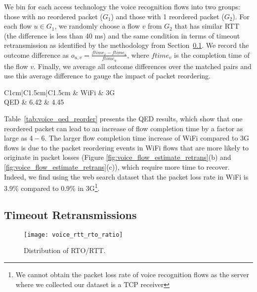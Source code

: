 We bin for each access technology the voice recognition flows into two groups: those with no reordered packet ($G_1$) and those with 1 reordered packet ($G_2$). For each flow $u \in G_1$, we randomly choose a flow $v$ from $G_2$ that has similar RTT (\ie the difference is less than 40 ms) and the same condition in terms of timeout retransmission as identified by the methodology from Section~\ref{sec:v_rto}. We record the outcome difference as $o_{u,v} = \frac{ftime_{v} - ftime_{u}}{ftime_{u}}$, where $ftime_v$ is the completion time of the flow $v$. Finally, we average all outcome differences over the matched pairs and use this average difference to gauge the impact of packet reordering.

\begin{table}[th]
\caption{QED results for the impact of packet reordering.}
\label{tab:voice_qed_reorder}
\centering
\renewcommand{\arraystretch}{1}
\begin{tabular}{C{1cm}|C{1.5cm}|C{1.5cm}}
	\hline
	 & WiFi & 3G \\
	\hline
	QED & 6.42 & 4.45 \\
	\hline
\end{tabular}
\end{table}

Table~\ref{tab:voice_qed_reorder} presents the QED results, which show that one reordered packet can lead to an increase of flow completion time by a factor as large as $4-6$. The larger flow completion time increase of WiFi compared to 3G flows is due to the packet reordering events in WiFi flows that are more likely to originate in packet losses (\ie Figure \ref{fig:voice_flow_estimate_retrans}(b) and \ref{fig:voice_flow_estimate_retrans}(c)), which require more time to recover. Indeed, we find using the web search dataset that the packet loss rate in WiFi is 3.9\% compared to 0.9\% in 3G\footnote{We cannot obtain the packet loss rate of voice recognition flows as the server where we collected our dataset is a TCP receiver}. 

\subsection{Timeout Retransmissions}\label{sec:v_rto}

\begin{figure}[th]
\centering
	\texttt{[image: voice\_rtt\_rto\_ratio]}
\caption{Distribution of RTO/RTT.}
\label{fig:rto_rtt}
\end{figure}

